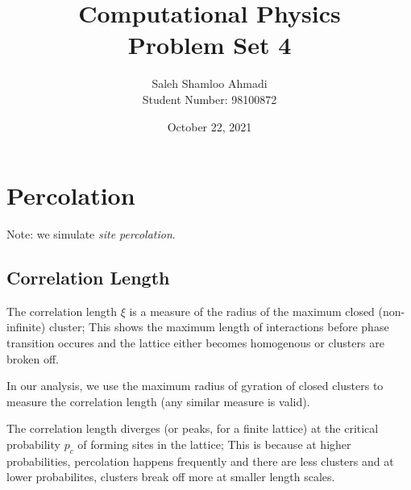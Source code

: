 \documentclass[12pt,a4paper]{article}
\title{Computational Physics\\Problem Set 4}
\author{Saleh Shamloo Ahmadi\\Student Number: 98100872}
\date{October 22, 2021}
\begin{document}
	\maketitle
	\section{Percolation}
	Note: we simulate \emph{site percolation}.
	\subsection{Correlation Length}
	The correlation length $\xi$ is a measure of the radius of the maximum closed (non-infinite) cluster;
	This shows the maximum length of interactions before phase transition occures and the lattice either becomes
	homogenous or clusters are broken off.
	
	In our analysis, we use the maximum radius of gyration of closed clusters to measure the correlation length
	(any similar measure is valid).

	The correlation length diverges (or peaks, for a finite lattice) at the critical probability $p_c$ of forming sites
	in the lattice; This is because at higher probabilities, percolation happens frequently and there are less clusters
	and at lower probabilites, clusters break off more at smaller length scales.
	
\end{document}
